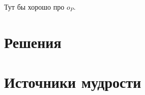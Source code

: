 \documentclass[11pt, a4paper]{article}
\newcounter{problem}[section]
\begin{document}
Тут бы хорошо про $o_P$.



\renewenvironment{solution}[1]{%
         \vskip .5cm plus 2cm minus 0.1cm%
         {\bfseries \hyperlink{problem:#1}{#1.}}%
}%
{%
}%

\section{Решения}


\section{Источники мудрости}
\printbibliography[heading=none]
\end{document}
